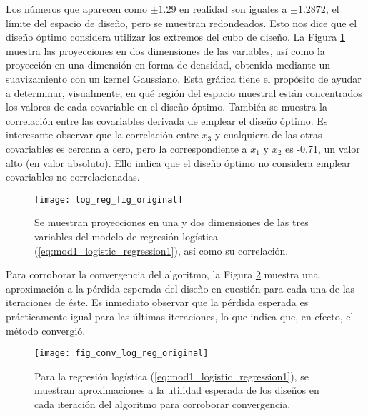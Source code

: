 Los números que aparecen como $\pm 1.29$ en realidad son iguales a $\pm 1.2872$, el límite del espacio de diseño, pero se muestran redondeados. Esto nos dice que el diseño óptimo considera utilizar los extremos del cubo de diseño. La Figura \ref{fig:log_reg_doe} muestra las proyecciones en dos dimensiones de las variables, así como la proyección en una dimensión en forma de densidad, obtenida mediante un suavizamiento con un kernel Gaussiano. Esta gráfica tiene el propósito de ayudar a determinar, visualmente, en qué región del espacio muestral están concentrados los valores de cada covariable en el diseño óptimo. También se muestra la correlación entre las covariables derivada de emplear el diseño óptimo. Es interesante observar que la correlación entre $x_3$ y cualquiera de las otras covariables es cercana a cero, pero la correspondiente a $x_1$ y $x_2$ es -0.71, un valor alto (en valor absoluto). Ello indica que el diseño óptimo no considera emplear covariables no correlacionadas. \\



\begin{figure}[h]
	\centering
    \texttt{[image: log\_reg\_fig\_original]}
    \caption{Se muestran proyecciones en una y dos dimensiones de las tres variables del modelo de regresión logística (\ref{eq:mod1_logistic_regression1}), así como su correlación.}
    \label{fig:log_reg_doe}
\end{figure}



Para corroborar la convergencia del algoritmo, la Figura \ref{fig:log_reg_conv} muestra una aproximación a la pérdida esperada del diseño en cuestión para cada una de las iteraciones de éste. Es inmediato observar que la pérdida esperada es prácticamente igual para las últimas iteraciones, lo que indica que, en efecto, el método convergió.


\begin{figure}[h]
	\centering
    \texttt{[image: fig\_conv\_log\_reg\_original]}
    \caption{Para la regresión logística (\ref{eq:mod1_logistic_regression1}), se muestran aproximaciones a la utilidad esperada de los diseños en cada iteración del algoritmo para corroborar convergencia.}
    \label{fig:log_reg_conv}
\end{figure}



\FloatBarrier


